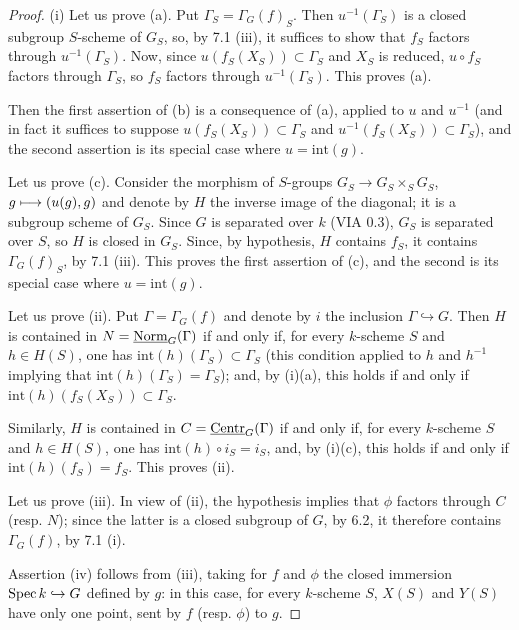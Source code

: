\begin{proof}
(i) Let us prove (a). Put $\Gamma_S=\Gamma_G(f)_S$. Then $u^{-1}(\Gamma_S)$ is a closed subgroup $S$-scheme of $G_S$, so, by 7.1 (iii), it suffices to show that $f_S$ factors through $u^{-1}(\Gamma_S)$. Now, since $u(f_S(X_S))\subset\Gamma_S$ and $X_S$ is reduced, $u\circ f_S$ factors through $\Gamma_S$, so $f_S$ factors through $u^{-1}(\Gamma_S)$. This proves (a).

Then the first assertion of (b) is a consequence of (a), applied to $u$ and $u^{-1}$ (and in fact it suffices to suppose $u(f_S(X_S))\subset\Gamma_S$ and $u^{-1}(f_S(X_S))\subset\Gamma_S$), and the second assertion is its special case where $u=\mathrm{int}(g)$.

Let us prove (c). Consider the morphism of $S$-groups $G_S\to G_S\times_SG_S$, $g\longmapsto(u(g),g)$ and denote by $H$ the inverse image of the diagonal; it is a subgroup scheme of $G_S$. Since $G$ is separated over $k$ (VIA 0.3), $G_S$ is separated over $S$, so $H$ is closed in $G_S$. Since, by hypothesis, $H$ contains $f_S$, it contains $\Gamma_G(f)_S$, by 7.1 (iii). This proves the first assertion of (c), and the second is its special case where $u=\mathrm{int}(g)$.

Let us prove (ii). Put $\Gamma=\Gamma_G(f)$ and denote by $i$ the inclusion $\Gamma\hookrightarrow G$. Then $H$ is contained in $N=\underline{\mathrm{Norm}}_G(\Gamma)$ if and only if, for every $k$-scheme $S$ and $h\in H(S)$, one has $\mathrm{int}(h)(\Gamma_S)\subset\Gamma_S$ (this condition applied to $h$ and $h^{-1}$ implying that $\mathrm{int}(h)(\Gamma_S)=\Gamma_S$); and, by (i)(a), this holds if and only if $\mathrm{int}(h)(f_S(X_S))\subset\Gamma_S$.

Similarly, $H$ is contained in $C=\underline{\mathrm{Centr}}_G(\Gamma)$ if and only if, for every $k$-scheme $S$ and $h\in H(S)$, one has $\mathrm{int}(h)\circ i_S=i_S$, and, by (i)(c), this holds if and only if $\mathrm{int}(h)(f_S)=f_S$. This proves (ii).

Let us prove (iii). In view of (ii), the hypothesis implies that $\phi$ factors through $C$ (resp. $N$); since the latter is a closed subgroup of $G$, by 6.2, it therefore contains $\Gamma_G(f)$, by 7.1 (i).

Assertion (iv) follows from (iii), taking for $f$ and $\phi$ the closed immersion $\operatorname{Spec} k\hookrightarrow G$ defined by $g$: in this case, for every $k$-scheme $S$, $X(S)$ and $Y(S)$ have only one point, sent by $f$ (resp. $\phi$) to $g$.


\end{proof}
